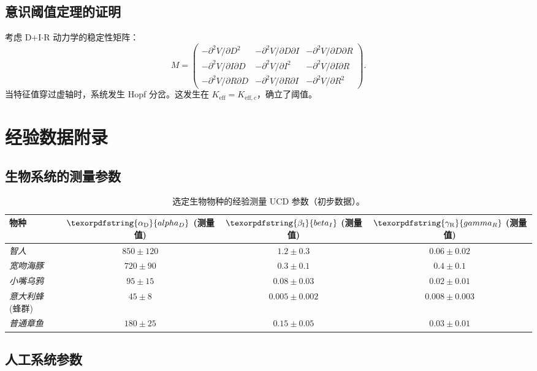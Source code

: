 \documentclass[11pt,a4paper]{article}
\DeclareRobustCommand{\alD}{\texorpdfstring{\ensuremath{\alpha_{\mathrm{D}}}}{alpha_D}}
\DeclareRobustCommand{\beI}{\texorpdfstring{\ensuremath{\beta_{\mathrm{I}}}}{beta_I}}
\DeclareRobustCommand{\gaR}{\texorpdfstring{\ensuremath{\gamma_{\mathrm{R}}}}{gamma_R}}
\newcommand{\eff}{\mathrm{eff}}
\newcommand{\Ke}{K_{\eff}}
\newcommand{\Kec}{K_{\eff,c}}
\begin{document}
	\subsection{意识阈值定理的证明}
	
	考虑 D+I\(\cdot\)R 动力学的稳定性矩阵：
	\[
	M = \begin{pmatrix}
		-\partial^2 V/\partial D^2 & -\partial^2 V/\partial D\partial I & -\partial^2 V/\partial D\partial R \\
		-\partial^2 V/\partial I\partial D & -\partial^2 V/\partial I^2 & -\partial^2 V/\partial I\partial R \\
		-\partial^2 V/\partial R\partial D & -\partial^2 V/\partial R\partial I & -\partial^2 V/\partial R^2
	\end{pmatrix}.
	\]
	当特征值穿过虚轴时，系统发生 Hopf 分岔。这发生在 \(\Ke = \Kec\)，确立了阈值。
	
	\section{经验数据附录}
	
	\subsection{生物系统的测量参数}
	
	\begin{table}[ht]
		\centering
		\begin{tabular}{lccc}
			\toprule
			\textbf{物种} & \(\alD\) (测量值) & \(\beI\) (测量值) & \(\gaR\) (测量值) \\
			\midrule
			\textit{智人} & \(850 \pm 120\) & \(1.2 \pm 0.3\) & \(0.06 \pm 0.02\) \\
			\textit{宽吻海豚} & \(720 \pm 90\) & \(0.3 \pm 0.1\) & \(0.4 \pm 0.1\) \\
			\textit{小嘴乌鸦} & \(95 \pm 15\) & \(0.08 \pm 0.03\) & \(0.02 \pm 0.01\) \\
			\textit{意大利蜂} (蜂群) & \(45 \pm 8\) & \(0.005 \pm 0.002\) & \(0.008 \pm 0.003\) \\
			\textit{普通章鱼} & \(180 \pm 25\) & \(0.15 \pm 0.05\) & \(0.03 \pm 0.01\) \\
			\bottomrule
		\end{tabular}
		\caption{选定生物物种的经验测量 UCD 参数（初步数据）。}
		\label{tab:bio-measurements}
	\end{table}
	
	\subsection{人工系统参数}
	
\end{document}
